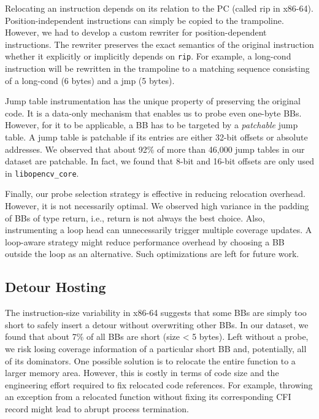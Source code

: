Relocating an instruction depends on its relation to the PC (called \textsf{rip} in x86-64).
Position-independent instructions can simply be copied to the trampoline.
However, we had to develop a custom rewriter for position-dependent instructions.
The rewriter preserves the exact semantics of the original instruction whether it explicitly or implicitly depends on \texttt{rip}. 
For example, a \textsf{long-cond} instruction will be rewritten in the trampoline to a matching sequence consisting of a \textsf{long-cond} (6 bytes) and a \textsf{jmp} (5 bytes).

Jump table instrumentation has the unique property of preserving the original code.
It is a data-only mechanism that enables us to probe even one-byte BBs.
However, for it to be applicable, a BB has to be targeted by a \textit{patchable} jump table.
A jump table is patchable if its entries are either 32-bit offsets or absolute addresses.
We observed that about 92\% of more than 46,000 jump tables in our dataset are patchable.
In fact, we found that 8-bit and 16-bit offsets are only used in \texttt{libopencv\_core}.


Finally, our probe selection strategy is effective in reducing relocation overhead.
However, it is not necessarily optimal.
We observed high variance in the padding of BBs of type \textsf{return}, i.e., \textsf{return} is not always the best choice.
Also, instrumenting a loop head can unnecessarily trigger multiple coverage updates. A loop-aware strategy might reduce performance overhead by choosing a BB outside the loop as an alternative. Such optimizations are left for future work.

\subsection{Detour Hosting}
\label{sec:detour-hosting}

The instruction-size variability in x86-64 suggests that some BBs are simply too short to safely insert a detour without overwriting other BBs.
In our dataset, we found that about 7\% of all BBs are short (size < 5 bytes).
Left without a probe, we risk losing coverage information of a particular short BB and, potentially, all of its dominators.
One possible solution is to relocate the entire function to a larger memory area.
However, this is costly in terms of code size and the engineering effort required to fix relocated code references.
For example, throwing an exception from a relocated function without fixing its corresponding CFI record might lead to abrupt process termination.


